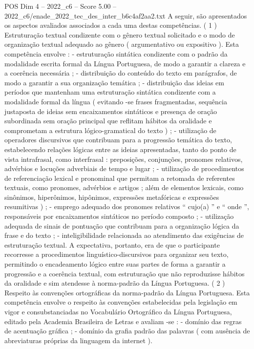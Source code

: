 \begin{textsample}{POS Dim 4 – 2022\_c6 – Score 5.00 – 2022\_c6/enade\_2022\_tec\_des\_inter\_b6c4af2aa2.txt}
A seguir, são apresentados os aspectos avaliados associados a cada uma destas competências. ( 1 ) Estruturação textual condizente com o gênero textual solicitado e o modo de organização textual adequado ao gênero ( argumentativo ou expositivo ).
Esta competência envolve : - estruturação sintática condizente com o padrão da modalidade escrita formal da Língua Portuguesa, de modo a garantir a clareza e a coerência necessária ; - distribuição do conteúdo do texto em parágrafos, de modo a garantir a sua organização temática ; - distribuição das ideias em períodos que mantenham uma estruturação sintática condizente com a modalidade formal da língua ( evitando -se frases fragmentadas, sequência justaposta de ideias sem encaixamentos sintáticos e presença de oração subordinada sem oração principal que reflitam hábitos da oralidade e comprometam a estrutura lógico-gramatical do texto ) ; - utilização de operadores discursivos que contribuam para a progressão temática do texto, estabelecendo relações lógicas entre as ideias apresentadas, tanto do ponto de vista intrafrasal, como interfrasal : preposições, conjunções, pronomes relativos, advérbios e locuções adverbiais de tempo e lugar ; - utilização de procedimentos de referenciação lexical e pronominal que permitam a retomada de referentes textuais, como pronomes, advérbios e artigos ; além de elementos lexicais, como sinônimos, hiperônimos, hipônimos, expressões metafóricas e expressões resumitivas ) ; - emprego adequado dos pronomes relativos “ cujo(a) ” e “ onde ”, responsáveis por encaixamentos sintáticos no período composto ; - utilização adequada de sinais de pontuação que contribuam para a organização lógica da frase e do texto ; - inteligibilidade relacionada ao atendimento das exigências de estruturação textual.
A expectativa, portanto, era de que o participante recorresse a procedimentos linguístico-discursivos para organizar seu texto, permitindo o encadeamento lógico entre suas partes de forma a garantir a progressão e a coerência textual, com estruturação que não reproduzisse hábitos da oralidade e sim atendesse à norma-padrão da Língua Portuguesa. ( 2 ) Respeito às convenções ortográficas da norma-padrão da Língua Portuguesa.
Esta competência envolve o respeito às convenções estabelecidas pela legislação em vigor e consubstanciadas no Vocabulário Ortográfico da Língua Portuguesa, editado pela Academia Brasileira de Letras e avaliam -se : - domínio das regras de acentuação gráfica ; - domínio da grafia padrão das palavras ( com ausência de abreviaturas próprias da linguagem da internet ).

\end{textsample}
